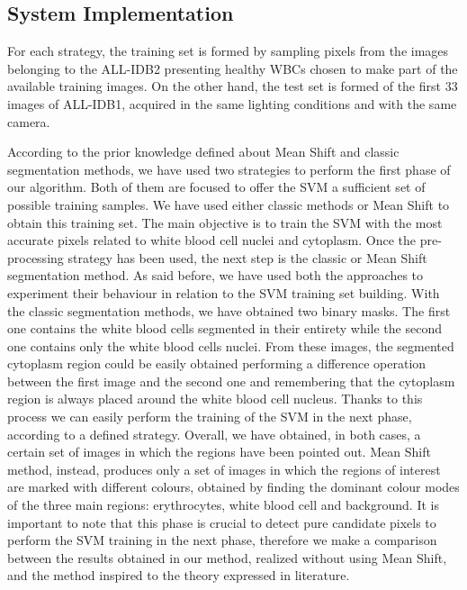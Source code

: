 \documentclass[final,a4paper,12pt,english]{UnicaPhdThesis3}
\begin{document}
	\subsection{System Implementation}
	For each strategy, the training set is formed by sampling pixels from the images belonging to the ALL-IDB2 presenting healthy WBCs chosen to make part of the available training images. On the other hand, the test set is formed of the first 33 images of ALL-IDB1, acquired in the same lighting conditions and with the same camera. 
	
	According to the prior knowledge defined about Mean Shift and classic segmentation methods, we have used two strategies to perform the first phase of our algorithm. Both of them are focused to offer the SVM a sufficient set of possible training samples. We have used either classic methods or Mean Shift to obtain this training set. The main objective is to train the SVM with the most accurate pixels related to white blood cell nuclei and cytoplasm. Once the pre-processing strategy has been used, the next step is the classic or Mean Shift segmentation method. As said before, we have used both the approaches to experiment their behaviour in relation to the SVM training set building. With the classic segmentation methods, we have obtained two binary masks. The first one contains the white blood cells segmented in their entirety while the second one contains only the white blood cells nuclei.
	From these images, the segmented cytoplasm region could be easily obtained performing a difference operation between the first image and the second one and remembering that the cytoplasm region is always placed around the white blood cell nucleus. Thanks to this process we can easily perform the training of the SVM in the next phase, according to a defined strategy. Overall, we have obtained, in both cases, a certain set of images in which the regions have been pointed out. Mean Shift method, instead, produces only a set of images in which the regions of interest are marked with different colours, obtained by finding the dominant colour modes of the three main regions: erythrocytes, white blood cell and background. 
	It is important to note that this phase is crucial to detect pure candidate pixels to perform the SVM training in the next phase, therefore we make a comparison between the results obtained in our method, realized without using Mean Shift, and the method inspired to the theory expressed in literature.
	
\end{document}
